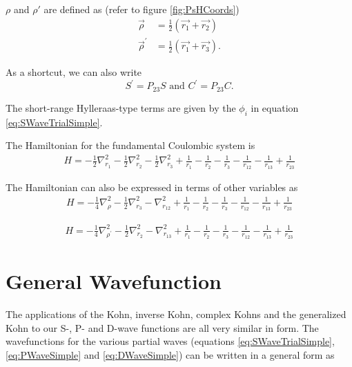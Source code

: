 \documentclass[Dissertation.tex]{subfiles}
\begin{document}
$\rho$ and $\rho'$ are defined as (refer to figure \ref{fig:PsHCoords})
\begin{subequations}
\begin{align}
\vec{\rho} &= \frac{1}{2}\left(\vec{r_1} + \vec{r_2}\right) \label{eq:RhoDef}\\
\vec{\rho}^\prime &= \frac{1}{2}\left(\vec{r_1} + \vec{r_3}\right) \label{eq:RhopDef}.
\end{align}
\end{subequations}

\noindent As a shortcut, we can also write
\begin{equation}
S^\prime = P_{23} S \text{ and } C^\prime = P_{23} C.
\label{eq:SCprime}
\end{equation}

The short-range Hylleraas-type terms are given by the $\phi_i$ in equation \ref{eq:SWaveTrialSimple}. 

The Hamiltonian for the fundamental Coulombic system is
\begin{align}
\label{eq:Hamiltonian1}
H = -\frac{1}{2} \nabla_{r_1}^2 - \frac{1}{2} \nabla_{r_2}^2 - \frac{1}{2} \nabla_{r_3}^2 + \frac{1}{r_1} - \frac{1}{r_2} - \frac{1}{r_3} - \frac{1}{r_{12}} -\frac {1}{r_{13}} + \frac{1}{r_{23}}
\end{align}

\noindent The Hamiltonian can also be expressed in terms of other variables as
\begin{align}
H = -\frac{1}{4} \nabla_{\rho}^2 - \frac{1}{2} \nabla_{r_3}^2 - \nabla_{r_{12}}^2 + \frac{1}{r_1} - \frac{1}{r_2} - \frac{1}{r_3} - \frac{1}{r_{12}} - \frac{1}{r_{13}} + \frac{1}{r_{23}}
\label{eq:Hamiltonian2}
\end{align}

\begin{align}
H = -\frac{1}{4} \nabla_{\rho^\prime}^2 - \frac{1}{2} \nabla_{r_2}^2 - \nabla_{r_{13}}^2 + \frac{1}{r_1} - \frac{1}{r_2} - \frac{1}{r_3} - \frac{1}{r_{12}} - \frac{1}{r_{13}} + \frac{1}{r_{23}}
\label{eq:Hamiltonian3}
\end{align}


\section{General Wavefunction}

The applications of the Kohn, inverse Kohn, complex Kohns and the generalized Kohn to our S-, P- and D-wave functions are all very similar in form. The wavefunctions for the various partial waves (equations \ref{eq:SWaveTrialSimple}, \ref{eq:PWaveSimple} and \ref{eq:DWaveSimple}) can be written in a general form as
\end{document}
